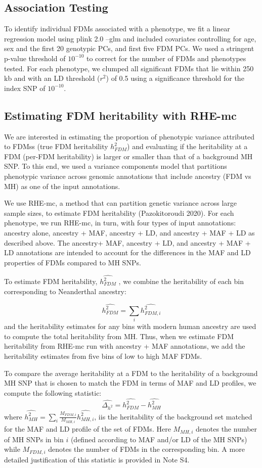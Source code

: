 \subsection{Association Testing}
To identify individual FDMs associated with a phenotype, we fit a linear regression model using plink 2.0 --glm and included covariates controlling for age, sex and the first 20 genotypic PCs, and first five FDM PCs. We used a stringent p-value threshold of $10^{-10}$ to correct for the number of FDMs and phenotypes tested. For each phenotype, we clumped all significant FDMs that lie within 250 kb and with an LD threshold ($r^2$) of 0.5 using a significance threshold for the index SNP of $10^{-10}$.


\subsection{Estimating FDM heritability with RHE-mc}
We are interested in estimating the proportion of phenotypic variance attributed to FDMss (true FDM heritability $h^2_{FDM}$) and evaluating if the heritability at a FDM (per-FDM heritability) is larger or smaller than that of a background MH SNP. To this end, we used a variance components model that partitions phenotypic variance across genomic annotations that include ancestry (FDM vs MH) as one of the input annotations.

We use RHE-mc, a method that can partition genetic variance across large sample sizes, to estimate FDM heritability (Pazokitoroudi 2020). For each phenotype, we run RHE-mc, in turn, with four types of input annotations: ancestry alone, ancestry + MAF, ancestry + LD, and ancestry + MAF + LD as described above. The ancestry+ MAF, ancestry + LD, and ancestry + MAF + LD annotations are intended to account for the differences in the MAF and LD properties of FDMs compared to MH SNPs.

To estimate FDM heritability, $\hat{h^2_{FDM}}$ , we combine the heritability of each bin corresponding to Neanderthal ancestry:

$$\hat{h^2_{FDM}} = \sum_i \hat{h^2_{FDM,i}}$$
and the heritability estimates for any bins with modern human ancestry are used to compute the total heritability from MH. Thus, when we estimate FDM heritability from RHE-mc run with ancestry + MAF annotations, we add the heritability estimates from five bins of low to high MAF FDMs.
 
To compare the average heritability at a FDM to the heritability of a background MH SNP that is chosen to match the FDM in terms of MAF and LD profiles, we compute the following statistic:
$$\hat{\Delta_{h^2}}=\hat{h^2_{FDM}}-\hat{h^2_{MH}}$$
where $\hat{h^2_{MH}} = \sum_i \frac{M_{FDM,i}}{M_{MH,i}} \hat{h^2_{MH,i}}$, iis the heritability of the background set matched for the MAF and LD profile of the set of FDMs. Here $M_{MH,i}$ denotes the number of MH SNPs in bin $i$  (defined according to MAF and/or LD of the MH SNPs) while $M_{FDM,i}$ denotes the number of FDMs in the corresponding bin. A more detailed justification of this statistic is provided in Note S4.

